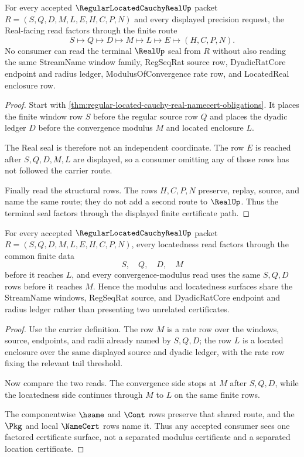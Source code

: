 \begin{theorem}
\label{thm:regular-located-cauchy-real-realup-seal-route}
For every accepted $\RegularLocatedCauchyRealUp$ packet $R=(S,Q,D,M,L,E,H,C,P,N)$ and every displayed precision request, the Real-facing read factors through the finite route
$$
S\longmapsto Q\longmapsto D\longmapsto M\longmapsto L\longmapsto E\longmapsto(H,C,P,N).
$$
No consumer can read the terminal $\RealUp$ seal from $R$ without also reading the same StreamName window family, RegSeqRat source row, DyadicRatCore endpoint and radius ledger, ModulusOfConvergence rate row, and LocatedReal enclosure row.
\end{theorem}
\begin{proof}
Start with \autoref{thm:regular-located-cauchy-real-namecert-obligations}. It places the finite window row $S$ before the regular source row $Q$ and places the dyadic ledger $D$ before the convergence modulus $M$ and located enclosure $L$.

The Real seal is therefore not an independent coordinate. The row $E$ is reached after $S,Q,D,M,L$ are displayed, so a consumer omitting any of those rows has not followed the carrier route.

Finally read the structural rows. The rows $H,C,P,N$ preserve, replay, source, and name the same route; they do not add a second route to $\RealUp$. Thus the terminal seal factors through the displayed finite certificate path.
\end{proof}

\begin{theorem}
\label{thm:regular-located-cauchy-real-modulus-location-factorization}
For every accepted $\RegularLocatedCauchyRealUp$ packet $R=(S,Q,D,M,L,E,H,C,P,N)$, every locatedness read factors through the common finite data
$$
S,\quad Q,\quad D,\quad M
$$
before it reaches $L$, and every convergence-modulus read uses the same $S,Q,D$ rows before it reaches $M$. Hence the modulus and locatedness surfaces share the StreamName windows, RegSeqRat source, and DyadicRatCore endpoint and radius ledger rather than presenting two unrelated certificates.
\end{theorem}
\begin{proof}
Use the carrier definition. The row $M$ is a rate row over the windows, source, endpoints, and radii already named by $S,Q,D$; the row $L$ is a located enclosure over the same displayed source and dyadic ledger, with the rate row fixing the relevant tail threshold.

Now compare the two reads. The convergence side stops at $M$ after $S,Q,D$, while the locatedness side continues through $M$ to $L$ on the same finite rows.

The componentwise $\hsame$ and $\Cont$ rows preserve that shared route, and the $\Pkg$ and local $\NameCert$ rows name it. Thus any accepted consumer sees one factored certificate surface, not a separated modulus certificate and a separated location certificate.
\end{proof}

